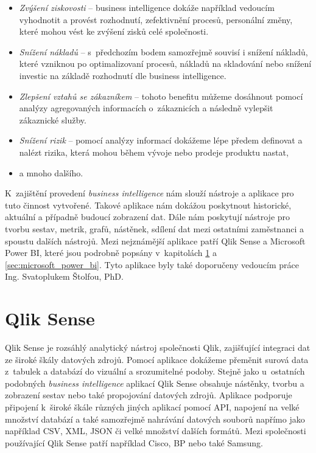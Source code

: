 \documentclass[czech,master]{diploma}
\begin{document}
\begin{itemize}
\item \textit{Zvýšení ziskovosti} -- business intelligence dokáže například vedoucím vyhodnotit a provést rozhodnutí, zefektivnění procesů, personální změny, které mohou vést ke zvýšení zisků celé společnosti.
\item \textit{Snížení nákladů} -- s~předchozím bodem samozřejmě souvisí i snížení nákladů, které vzniknou po optimalizovaní procesů, nákladů na skladování nebo snížení investic na základě rozhodnutí dle business intelligence.
\item \textit{Zlepšení vztahů se zákazníkem} -- tohoto benefitu můžeme dosáhnout pomocí analýzy agregovaných informacích o~zákaznicích a následně vylepšit zákaznické služby.
\item \textit{Snížení rizik} -- pomocí analýzy informací dokážeme lépe předem definovat a nalézt rizika, která mohou během vývoje nebo prodeje produktu nastat,
\item a mnoho dalšího.
\end{itemize}

K~zajištění provedení \textit{business intelligence} nám slouží nástroje a aplikace pro tuto činnost vytvořené. Takové aplikace nám dokážou poskytnout historické, aktuální a případně budoucí zobrazení dat. Dále nám poskytují nástroje pro tvorbu sestav, metrik, grafů, nástěnek, sdílení dat mezi ostatními zaměstnanci a spoustu dalších nástrojů. Mezi nejznámější aplikace patří Qlik Sense a Microsoft Power BI, které jsou podrobně popsány v~kapitolách \ref{sec:qlik} a \ref{sec:microsoft_power_bi}. Tyto aplikace byly také doporučeny vedoucím práce Ing. Svatoplukem Štolfou, PhD.

\section{Qlik Sense}
\label{sec:qlik}
Qlik Sense je rozsáhlý analytický nástroj společnosti Qlik, zajišťující integraci dat ze široké škály datových zdrojů. Pomocí aplikace dokážeme přeměnit surová data z~tabulek a databází do vizuální a srozumitelné podoby. Stejně jako u~ostatních podobných \textit{business intelligence} aplikací Qlik Sense obsahuje nástěnky, tvorbu a zobrazení sestav nebo také propojování datových zdrojů. Aplikace podporuje připojení k~široké škále různých jiných aplikací pomocí API, napojení na velké množství databází a také samozřejmě nahrávání datových souborů napřímo jako například CSV, XML, JSON či velké množství dalších formátů. Mezi společnosti používající Qlik Sense patří například Cisco, BP nebo také Samsung. \cite{ref:qlik_general}
\end{document}
